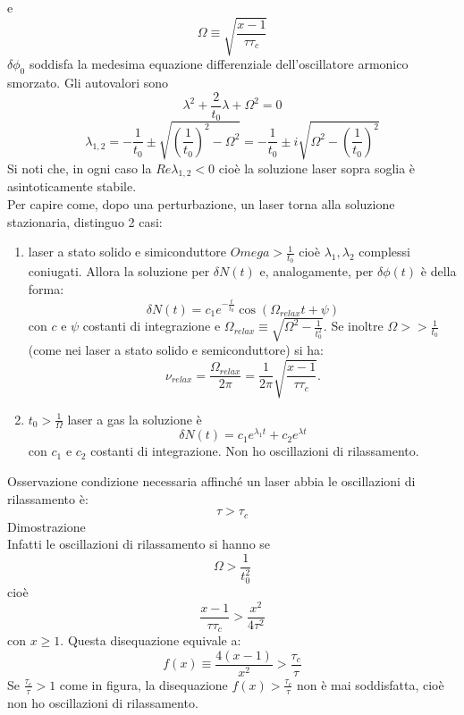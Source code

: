 \documentclass{book}
\def \l {\lambda}
\theoremstyle{remark}
\begin{document}
e
\begin{equation*}
\Omega \equiv \sqrt{\frac{x-1}{\tau\tau_c}}
\end{equation*}
$\delta\phi_0$ soddisfa la medesima equazione differenziale dell'oscillatore armonico smorzato. Gli autovalori sono
\begin{equation*}
\l^2 + \frac{2}{t_0} \l + \Omega^2 = 0
\end{equation*}
\begin{equation*}
\l_{1,2} = -\frac{1}{t_0} \pm \sqrt{\left(\frac{1}{t_0}\right)^2 - \Omega^2} = -\frac{1}{t_0} \pm i\sqrt{\Omega^2 - \left(\frac{1}{t_0}\right)^2}
\end{equation*}
Si noti che, in ogni caso la $Re{\l_{1,2}} < 0$ cioè la soluzione laser sopra soglia è asintoticamente stabile.
\\
Per capire come, dopo una perturbazione, un laser torna alla soluzione stazionaria, distinguo 2 casi:
\begin{enumerate}
\item laser a stato solido e simiconduttore $Omega > \frac{1}{t_0}$ cioè $\l_1, \l_2$ complessi coniugati. Allora la soluzione per $\delta N(t)$ e, analogamente, per $\delta\phi(t)$ è della forma:
\begin{equation*}
\delta N(t) = c_1 e^{-\frac{t}{t_0}} \cos(\Omega_{relax} t + \psi)
\end{equation*}
con $c$ e $\psi$ costanti di integrazione e $\Omega_{relax} \equiv \sqrt{\Omega^2 - \frac{1}{t_0^2}}$. Se inoltre $\Omega >> \frac{1}{t_0}$ (come nei laser a stato solido e semiconduttore) si ha:
\begin{equation*}
\nu_{relax} = \frac{\Omega_{relax}}{2\pi} = \frac{1}{2\pi} \sqrt{\frac{x-1}{\tau\tau_c}}.
\end{equation*}
\item $t_0 > \frac{1}{\Omega}$ laser a gas
la soluzione è
\begin{equation*}
\delta N(t) = c_1 e^{\l_1 t} + c_2 e^{\l t}
\end{equation*}
con $c_1$ e $c_2$ costanti di integrazione. Non ho oscillazioni di rilassamento.
\end{enumerate}
Osservazione condizione necessaria affinché un laser abbia le oscillazioni di rilassamento è:
\begin{equation*}
\tau > \tau_c
\end{equation*}
Dimostrazione\\
Infatti le oscillazioni di rilassamento si hanno se
\begin{equation*}
\Omega > \frac{1}{t_0^2}
\end{equation*}
cioè
\begin{equation*}
\frac{x-1}{\tau\tau_c} > \frac{x^2}{4\tau^2}
\end{equation*}
con $x \geq 1$.
Questa disequazione equivale a:
\begin{equation*}
f(x) \equiv \frac{4 (x-1)}{x^2} > \frac{\tau_c}{\tau}
\end{equation*}
Se $\frac{\tau_c}{\tau} > 1$ come in figura, la disequazione $f(x) > \frac{\tau_c}{\tau}$ non è mai soddisfatta, cioè non ho oscillazioni di rilassamento.
\end{document}
